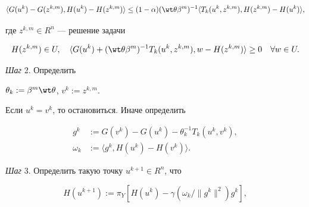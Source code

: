 \begin{equation} 


\label{eq:9} 


\langle G(u^{k}) - G(z^{k,m}), H(u^{k}) - H(z^{k,m}) \rangle


\leq(1 - \alpha)(\wt \theta \beta ^{m})^{-1} 


\langle T_{k}(u^{k}, z^{k,m}), H(z^{k,m}) - H(u^{k}) \rangle , 


\end{equation} 


где $z^{k,m} \in R^{n}$ --- решение задачи


\begin{equation}\label{eq:10} 


H(z^{k,m}) \in U, \quad


\langle G(u^{k})+(\wt \theta \beta ^{m})^{-1} T_{k}(u^{k}, z^{k,m}), 


w - H(z^{k,m}) \rangle \geq 0 \quad \forall w \in U. 


\end{equation}





{\it Шаг} 2. Определить


$\theta_{k}:=\beta ^{m} \wt \theta$, $v^{k}:=z^{k,m}$. 


Если $u^{k}=v^{k} $, то остановиться. Иначе определить


\begin{equation}\label{eq:11} 


\begin{split}


g^{k} &:=G(v^{k}) - G(u^{k}) - \theta_{k}^{-1} T_{k}(u^{k}, v^{k}),\\


\omega_{k} &:=\langle g^{k}, H(u^{k}) - H(v^{k}) \rangle. 


\end{split}


\end{equation}


 


{\it Шаг} 3. Определить такую точку $u^{k+1} \in R^{n}$, что


\begin{equation} \label{eq:11a} 


H(u^{k+1}):=\pi_{Y} [ H(u^{k}) - \gamma(\omega_{k} / \| g^{k} \|^{2}) g^{k}],


\end{equation}


